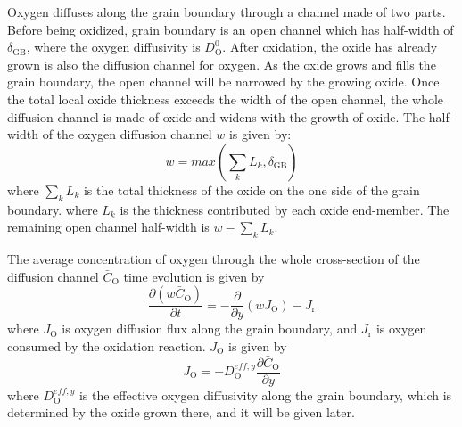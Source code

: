 \documentclass[3p,times,nonatbib]{elsarticle} %
\newcommand{\GB}{\mathrm{GB}}
\newcommand{\Ox}{\mathrm{O}}           %
\begin{document}
Oxygen diffuses along the grain boundary through a channel made of two parts. Before being oxidized, grain boundary is an open channel which has half-width of \(\delta_{\GB}\), where the oxygen diffusivity is \(D_\Ox^0\). After oxidation, the oxide has already grown is also the diffusion channel for oxygen. As the oxide grows and fills the grain boundary, the open channel will be narrowed by the growing oxide. Once the total local oxide thickness exceeds the width of the open channel, the whole diffusion channel is made of oxide and widens with the growth of oxide. The half-width of the oxygen diffusion channel \(w\) is given by:
\begin{equation}
    w=max\left(\sum_k L_k, \delta_{\GB}\right)
\label{eq:halfwidth}
\end{equation}
where \(\sum_k L_k\) is the total thickness of the oxide on the one side of the grain boundary. where \(L_k\) is the thickness contributed by each oxide end-member. The remaining open channel half-width is \(w-\sum_k L_k\).

The average concentration of oxygen through the whole cross-section of the diffusion channel \(\bar{C}_\Ox\) time evolution is given by    
\begin{equation}
\frac{\partial\left(w\bar{C}_\Ox\right)}{\partial t} = -\frac{\partial}{\partial y}\left(w J_\Ox\right)-J_\mathrm{r}
\end{equation}
where \(J_\Ox\) is oxygen diffusion flux along the grain boundary, and \(J_\mathrm{r}\) is oxygen consumed by the oxidation reaction. \(J_\Ox\) is given by
\begin{equation}
J_\Ox = -D_\Ox^{eff,y} \frac{\partial \bar{C}_\Ox}{\partial y}
\end{equation}
where \(D_\Ox^{eff,y}\) is the effective oxygen diffusivity along the grain boundary, which is determined by the oxide grown there, and it will be given later.
\end{document}
